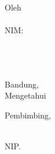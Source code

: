 
\clearpage
\pagestyle{empty}

\begin{center}

    \Large\bfseries\MakeUppercase{\judulta}

    \vfill

    \Large \subtitle

    \vfill

    \large Oleh \\[0.3em]
    \MakeUppercase{\penulis} \\[0.2em]
    NIM: \nim \\

    \prodi \\
	\normalsize \normalfont
	\fakultasplain \\
	\itb \\

    \vfill

    Bandung, \tanggallengkap\\
    Mengetahui

    \vspace{0.5cm}
    Pembimbing,

    \vfill

    \underline{\pembimbing}\\
    NIP. \nip

\end{center}

\clearpage

